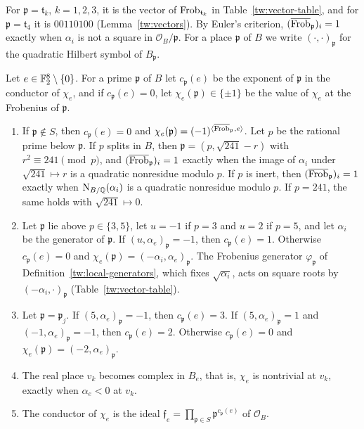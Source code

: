For $\mathfrak p=\mathfrak t_k$, $k=1,2,3$, it is the vector of
$\operatorname{Frob}_{\mathfrak t_k}$ in Table~\ref{tw:vector-table}, and for
$\mathfrak p=\mathfrak t_4$ it is $00110100$ (Lemma~\ref{tw:vectors}). By
Euler's criterion,
$(\overline{\operatorname{Frob}}_{\mathfrak p})_i=1$ exactly when $\alpha_i$ is not a
square in $\mathcal O_B/\mathfrak p$. For a
place $\mathfrak p$ of $B$ we write $(\cdot,\cdot)_{\mathfrak p}$ for the
quadratic Hilbert symbol of $B_{\mathfrak p}$.

\begin{proposition}\label{gf:local-data}
Let $e\in\mathbb F_2^8\setminus\{0\}$. For a prime $\mathfrak p$ of $B$ let
$c_{\mathfrak p}(e)$ be the exponent of $\mathfrak p$ in the conductor of
$\chi_e$, and if $c_{\mathfrak p}(e)=0$, let $\chi_e(\mathfrak p)\in\{\pm1\}$
be the value of $\chi_e$ at the Frobenius of $\mathfrak p$.
\begin{enumerate}
\item If $\mathfrak p\notin S$, then $c_{\mathfrak p}(e)=0$ and
 $\chi_e(\mathfrak p)=(-1)^{\langle\overline{\operatorname{Frob}}_{\mathfrak p},e\rangle}$.
 Let $p$ be the rational prime below $\mathfrak p$. If $p$ splits in $B$, then
 $\mathfrak p=(p,\sqrt{241}-r)$ with $r^2\equiv241\pmod p$, and
 $(\overline{\operatorname{Frob}}_{\mathfrak p})_i=1$ exactly when the image of $\alpha_i$
 under $\sqrt{241}\mapsto r$ is a quadratic nonresidue modulo $p$. If $p$ is
 inert, then $(\overline{\operatorname{Frob}}_{\mathfrak p})_i=1$ exactly when
 $\mathrm N_{B/\mathbb Q}(\alpha_i)$ is a quadratic nonresidue modulo $p$. If $p=241$, the
 same holds with $\sqrt{241}\mapsto0$.
\item Let $\mathfrak p$ lie above $p\in\{3,5\}$, let $u=-1$ if $p=3$ and $u=2$
 if $p=5$, and let $\alpha_i$ be the generator of $\mathfrak p$. If
 $(u,\alpha_e)_{\mathfrak p}=-1$, then $c_{\mathfrak p}(e)=1$. Otherwise
 $c_{\mathfrak p}(e)=0$ and
 $\chi_e(\mathfrak p)=(-\alpha_i,\alpha_e)_{\mathfrak p}$. The Frobenius
 generator $\varphi_{\mathfrak p}$ of Definition~\ref{tw:local-generators},
 which fixes $\sqrt{\alpha_i}$, acts on square roots by
 $(-\alpha_i,\cdot)_{\mathfrak p}$ (Table~\ref{tw:vector-table}).
\item Let $\mathfrak p=\mathfrak p_j$. If $(5,\alpha_e)_{\mathfrak p}=-1$, then
 $c_{\mathfrak p}(e)=3$. If $(5,\alpha_e)_{\mathfrak p}=1$ and
 $(-1,\alpha_e)_{\mathfrak p}=-1$, then $c_{\mathfrak p}(e)=2$. Otherwise
 $c_{\mathfrak p}(e)=0$ and $\chi_e(\mathfrak p)=(-2,\alpha_e)_{\mathfrak p}$.
\item The real place $v_k$ becomes complex in $B_e$, that is, $\chi_e$ is
 nontrivial at $v_k$, exactly when $\alpha_e<0$ at $v_k$.
\item The conductor of $\chi_e$ is the ideal
 $\mathfrak f_e=\prod_{\mathfrak p\in S}\mathfrak p^{c_{\mathfrak p}(e)}$ of
 $\mathcal O_B$.
\end{enumerate}
\end{proposition}

